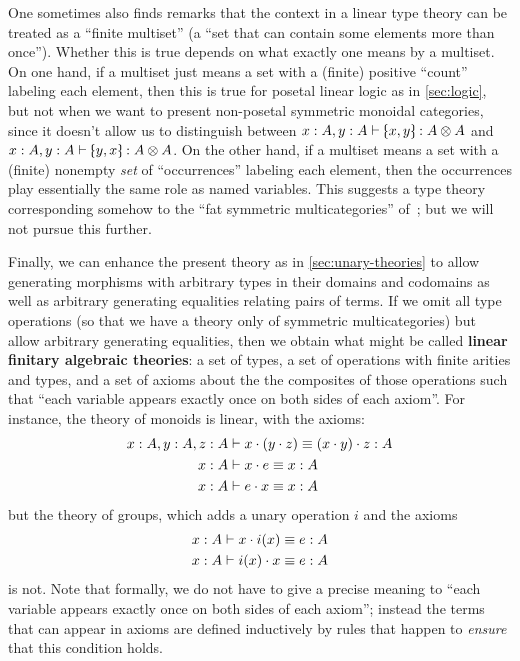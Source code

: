 One sometimes also finds remarks that the context in a linear type theory can be treated as a ``finite multiset'' (a ``set that can contain some elements more than once'').
Whether this is true depends on what exactly one means by a multiset.
On one hand, if a multiset just means a set with a (finite) positive ``count'' labeling each element, then this is true for posetal linear logic as in \cref{sec:logic}, but not when we want to present non-posetal symmetric monoidal categories, since it doesn't allow us to distinguish between $x:A,y:A \types \tpair x y:A\tensor A$ and $x:A,y:A \types \tpair y x:A\tensor A$.
On the other hand, if a multiset means a set with a (finite) nonempty \emph{set} of ``occurrences'' labeling each element, then the occurrences play essentially the same role as named variables.
This suggests a type theory corresponding somehow to the ``fat symmetric multicategories'' of~\cite[Appendix A]{leinster:higher-opds}; but we will not pursue this further.

Finally, we can enhance the present theory as in \cref{sec:unary-theories} to allow generating morphisms with arbitrary types in their domains and codomains as well as arbitrary generating equalities relating pairs of terms.
If we omit all type operations (so that we have a theory only of symmetric multicategories) but allow arbitrary generating equalities, then we obtain what might be called \textbf{linear finitary algebraic theories}: a set of types, a set of operations with finite arities and types, and a set of axioms about the the composites of those operations such that ``each variable appears exactly once on both sides of each axiom''.
For instance, the theory of monoids is linear, with the axioms:
\begin{align*}
  x:A,y:A,z:A &\vdash x\cdot (y\cdot z) \equiv (x\cdot y)\cdot z :A\\
  x:A &\vdash x\cdot e \equiv x:A\\
  x:A &\vdash e\cdot x \equiv x:A
\end{align*}
but the theory of groups, which adds a unary operation $i$ and the axioms
\begin{align*}
  x:A &\vdash x\cdot i(x) \equiv e:A \\
  x:A &\vdash i(x)\cdot x \equiv e:A
\end{align*}
is not.
Note that formally, we do not have to give a precise meaning to ``each variable appears exactly once on both sides of each axiom''; instead the terms that can appear in axioms are defined inductively by rules that happen to \emph{ensure} that this condition holds.


